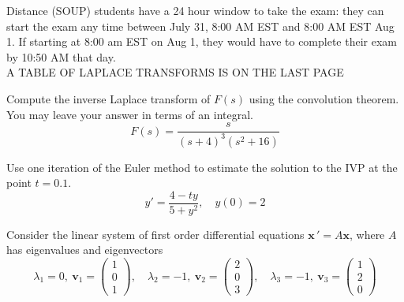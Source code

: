 \documentclass[11pt]{exam}
\begin{document}
    
    

    
\vspace{.1cm}
\begin{center}
    Distance (SOUP) students have a 24 hour window to take the exam: they can start the exam any time between July 31, 8:00 AM EST and 8:00 AM EST Aug 1. If starting at 8:00 am EST on Aug 1, they would have to complete their exam by 10:50 AM that day.  \\ \vspace{12pt}
    A TABLE OF LAPLACE TRANSFORMS IS ON THE LAST PAGE
\end{center}

\newpage \InitialsRight

\begin{questions}


    \question[6] %
    Compute the inverse Laplace transform of $F(s)$ using the convolution theorem. You may leave your answer in terms of an integral. 
    $$F(s) = \frac{s}{(s+4)^3(s^2+16)}$$  %
    
    \vspace{8cm} 
    
    \question[2] %
    Use one iteration of the Euler method to estimate the solution to the IVP at the point $t = 0.1$. 
    $$y' = \frac{4 - ty}{5 + y^2}, \quad y(0) = 2$$ %
    
    
    
\newpage \InitialsLeft

    \question[6] Consider the linear system of first order differential equations $\displaystyle \mathbf x \, ' = A \mathbf x$, where $A$ has eigenvalues and eigenvectors 
    $$\lambda_1 = 0, \ \mathbf v_1 = \begin{pmatrix} 1 \\ 0 \\ 1 \end{pmatrix}, 
    \quad \lambda _2 = -1 , \  \mathbf v_2 = \begin{pmatrix} 2 \\ 0 \\ 3 \end{pmatrix}, 
    \quad \lambda _3 = -1 , \  \mathbf v_3 = \begin{pmatrix} 1 \\ 2 \\ 0 \end{pmatrix} 
    $$
    

\end{questions}
\end{document}

